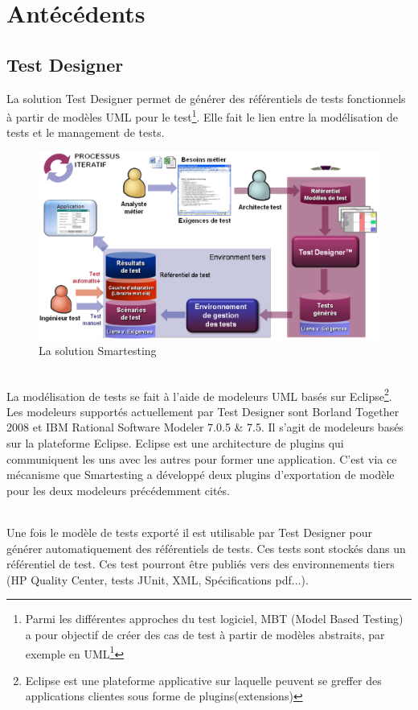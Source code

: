 \chapter{Antécédents}

\section{Test Designer}
La solution Test Designer permet de générer des référentiels de tests fonctionnels à partir de modèles UML pour le test\footnote{Parmi les différentes approches du test logiciel, MBT (Model Based Testing) a pour objectif de créer des cas de test à partir de modèles abstraits, par exemple en UML\footnote{Unified Modelling Language}}. Elle fait le lien entre la modélisation de tests et le management de tests.

\begin{figure}[!ht]
\centering
\includegraphics[width=\textwidth]{Illustrations/TheSolutionSmartesting.png}
\caption{La solution Smartesting}
\label{figure:La Solution Smartesting}
\end{figure}

\subparagraph*{}
La modélisation de tests se fait à l'aide de modeleurs UML basés sur Eclipse\footnote{Eclipse est une plateforme applicative sur laquelle peuvent se greffer des applications clientes sous forme de plugins(extensions)}. Les modeleurs supportés actuellement par Test Designer sont Borland Together 2008 et IBM Rational Software Modeler 7.0.5 \& 7.5. Il s'agit de modeleurs basés sur la plateforme Eclipse. Eclipse est une architecture de plugins qui communiquent les uns avec les autres pour former une application. C'est via ce mécanisme que Smartesting a développé deux plugins d'exportation de modèle pour les deux modeleurs précédemment cités.

\subparagraph*{}
Une fois le modèle de tests exporté il est utilisable par Test Designer pour générer automatiquement des référentiels de tests. Ces tests sont stockés dans un référentiel de test. Ces test pourront être publiés vers des environnements tiers (HP Quality Center, tests JUnit, XML, Spécifications pdf...).

